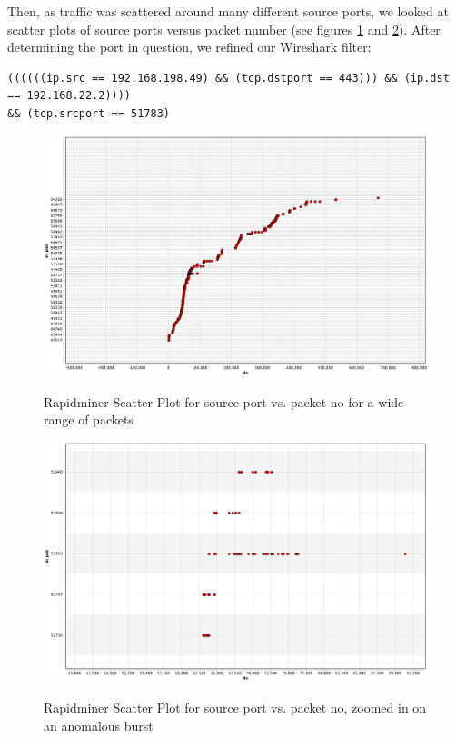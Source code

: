\documentclass{article}
\begin{document}
Then, as traffic was scattered around many different source ports, we looked at scatter plots of source ports versus packet number (see figures \ref{fig:RMscreen2} and \ref{fig:RMscreen3}). After determining the port in question, we refined our Wireshark filter:
\begin{verbatim}
((((((ip.src == 192.168.198.49) && (tcp.dstport == 443))) && (ip.dst == 192.168.22.2)))) 
&& (tcp.srcport == 51783)
\end{verbatim}

\begin{figure}[H] 
	\centering %
	{\includegraphics[width=\textwidth]{images/ex2_scatter_src_no_49_2_wide.png}} %
	\caption{Rapidminer Scatter Plot for source port vs. packet no for a wide range of packets} 
	\label{fig:RMscreen2} %
\end{figure} 
\begin{figure}[H] 
	\centering %
	{\includegraphics[width=\textwidth]{images/ex2_scatter_src_no_49_2_tight.png}} %
	\caption{Rapidminer Scatter Plot for source port vs. packet no, zoomed in on an anomalous burst} 
	\label{fig:RMscreen3} %
\end{figure} 
\end{document}
